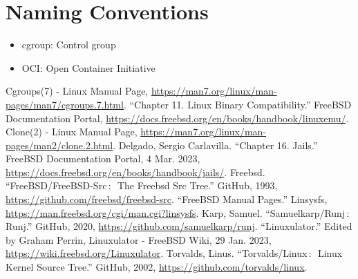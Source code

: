 \documentclass[12pt, dvipsnames, a4paper]{article}
\begin{document}
\section{Naming Conventions}
\begin{itemize}
	\item {cgroup: Control group}
	\item {OCI: Open Container Initiative}
\end{itemize}
\clearpage

\begin{thebibliography}{00}
	 Cgroups(7) - Linux Manual Page, \href{https://man7.org/linux/man-pages/man7/cgroups.7.html}{https://man7.org/linux/man-pages/man7/cgroups.7.html}.
	 “Chapter 11. Linux Binary Compatibility.” FreeBSD Documentation Portal, \href{https://docs.freebsd.org/en/books/handbook/linuxemu/}{https://docs.freebsd.org/en/books/handbook/linuxemu/}.
	 Clone(2) - Linux Manual Page, \href{https://man7.org/linux/man-pages/man2/clone.2.html}{https://man7.org/linux/man-pages/man2/clone.2.html}.
	 Delgado, Sergio  Carlavilla. “Chapter 16. Jails.” FreeBSD Documentation Portal, 4 Mar. 2023, \href{https://docs.freebsd.org/en/books/handbook/jails/}{https://docs.freebsd.org/en/books/handbook/jails/}.
	 Freebsd. “FreeBSD/FreeBSD-Src$\,\colon\,$ The Freebsd Src Tree.” GitHub, 1993, \href{https://github.com/freebsd/freebsd-src}{https://github.com/freebsd/freebsd-src}.
	 “FreeBSD Manual Pages.” Linsysfs, \href{https://man.freebsd.org/cgi/man.cgi?linsysfs}{https://man.freebsd.org/cgi/man.cgi?linsysfs}.
	 Karp, Samuel. “Samuelkarp/Runj$\,\colon\,$ Runj.” GitHub, 2020, \href{https://github.com/samuelkarp/runj}{https://github.com/samuelkarp/runj}.
	 “Linuxulator.” Edited by Graham Perrin, Linuxulator - FreeBSD Wiki, 29 Jan. 2023, \href{https://wiki.freebsd.org/Linuxulator}{https://wiki.freebsd.org/Linuxulator}.
	 Torvalds, Linus. “Torvalds/Linux$\,\colon\,$ Linux Kernel Source Tree.” GitHub, 2002, \href{https://github.com/torvalds/linux}{https://github.com/torvalds/linux}.



\end{thebibliography}
\end{document}
